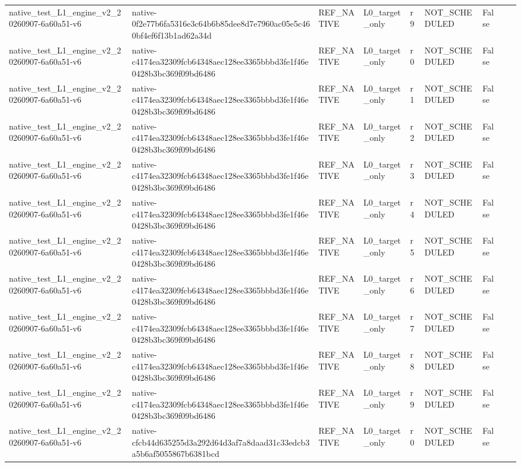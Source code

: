 \begin{tabular}{lllllllll}
native\_test\_L1\_engine\_v2\_20260907-6a60a51-v6 & native-0f2e77b6fa5316e3c64b6b85dee8d7e7960ac05e5c460bf4ef6f13b1ad62a34d & REF\_NATIVE & L0\_target\_only & r9 & NOT\_SCHEDULED & False &  &  \\
native\_test\_L1\_engine\_v2\_20260907-6a60a51-v6 & native-c4174ea32309fcb64348aec128ee3365bbbd3fe1f46e0428b3bc369f09bd6486 & REF\_NATIVE & L0\_target\_only & r0 & NOT\_SCHEDULED & False &  &  \\
native\_test\_L1\_engine\_v2\_20260907-6a60a51-v6 & native-c4174ea32309fcb64348aec128ee3365bbbd3fe1f46e0428b3bc369f09bd6486 & REF\_NATIVE & L0\_target\_only & r1 & NOT\_SCHEDULED & False &  &  \\
native\_test\_L1\_engine\_v2\_20260907-6a60a51-v6 & native-c4174ea32309fcb64348aec128ee3365bbbd3fe1f46e0428b3bc369f09bd6486 & REF\_NATIVE & L0\_target\_only & r2 & NOT\_SCHEDULED & False &  &  \\
native\_test\_L1\_engine\_v2\_20260907-6a60a51-v6 & native-c4174ea32309fcb64348aec128ee3365bbbd3fe1f46e0428b3bc369f09bd6486 & REF\_NATIVE & L0\_target\_only & r3 & NOT\_SCHEDULED & False &  &  \\
native\_test\_L1\_engine\_v2\_20260907-6a60a51-v6 & native-c4174ea32309fcb64348aec128ee3365bbbd3fe1f46e0428b3bc369f09bd6486 & REF\_NATIVE & L0\_target\_only & r4 & NOT\_SCHEDULED & False &  &  \\
native\_test\_L1\_engine\_v2\_20260907-6a60a51-v6 & native-c4174ea32309fcb64348aec128ee3365bbbd3fe1f46e0428b3bc369f09bd6486 & REF\_NATIVE & L0\_target\_only & r5 & NOT\_SCHEDULED & False &  &  \\
native\_test\_L1\_engine\_v2\_20260907-6a60a51-v6 & native-c4174ea32309fcb64348aec128ee3365bbbd3fe1f46e0428b3bc369f09bd6486 & REF\_NATIVE & L0\_target\_only & r6 & NOT\_SCHEDULED & False &  &  \\
native\_test\_L1\_engine\_v2\_20260907-6a60a51-v6 & native-c4174ea32309fcb64348aec128ee3365bbbd3fe1f46e0428b3bc369f09bd6486 & REF\_NATIVE & L0\_target\_only & r7 & NOT\_SCHEDULED & False &  &  \\
native\_test\_L1\_engine\_v2\_20260907-6a60a51-v6 & native-c4174ea32309fcb64348aec128ee3365bbbd3fe1f46e0428b3bc369f09bd6486 & REF\_NATIVE & L0\_target\_only & r8 & NOT\_SCHEDULED & False &  &  \\
native\_test\_L1\_engine\_v2\_20260907-6a60a51-v6 & native-c4174ea32309fcb64348aec128ee3365bbbd3fe1f46e0428b3bc369f09bd6486 & REF\_NATIVE & L0\_target\_only & r9 & NOT\_SCHEDULED & False &  &  \\
native\_test\_L1\_engine\_v2\_20260907-6a60a51-v6 & native-cfcb44d635255d3a292d64d3af7a8daad31c33edcb3a5b6af5055867b6381bcd & REF\_NATIVE & L0\_target\_only & r0 & NOT\_SCHEDULED & False &  &  \\

\end{tabular}
